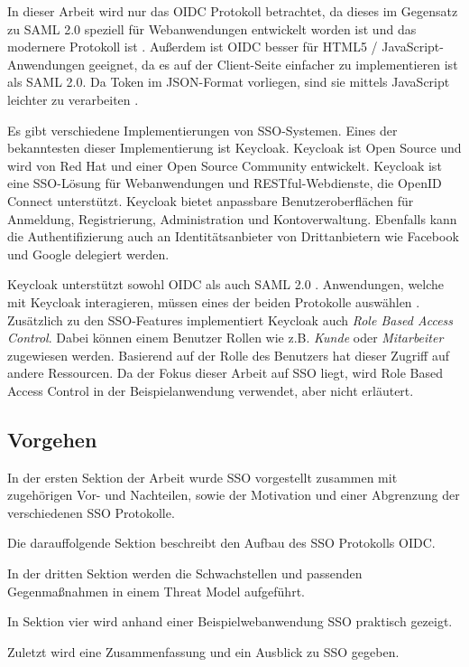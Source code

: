 In dieser Arbeit wird nur das OIDC Protokoll betrachtet, da dieses im Gegensatz zu SAML 2.0 speziell für Webanwendungen entwickelt worden ist und das modernere Protokoll ist \cite[OpenID Connect vs. SAML]{keycloakDocs}. Außerdem ist OIDC besser für HTML5 / JavaScript-Anwendungen geeignet, da es auf der Client-Seite einfacher zu implementieren ist als SAML 2.0. Da Token im JSON-Format vorliegen, sind sie mittels JavaScript leichter zu verarbeiten \cite{ssoProtocols}.

Es gibt verschiedene Implementierungen von SSO-Systemen. Eines der bekanntesten dieser Implementierung ist Keycloak. Keycloak ist Open Source und wird von Red Hat und einer Open Source Community entwickelt. Keycloak ist eine SSO-Lösung für Webanwendungen und RESTful-Webdienste, die OpenID Connect unterstützt. Keycloak bietet anpassbare Benutzeroberflächen für Anmeldung, Registrierung, Administration und Kontoverwaltung. Ebenfalls kann die Authentifizierung auch an Identitätsanbieter von Drittanbietern wie Facebook und Google delegiert werden. \cite{keycloakDocs}

Keycloak unterstützt sowohl OIDC als auch SAML 2.0 \cite{EB26}. Anwendungen, welche mit Keycloak interagieren, müssen eines der beiden Protokolle auswählen \cite{EB26}. Zusätzlich zu den SSO-Features implementiert Keycloak auch \textit{Role Based Access Control}. Dabei können einem Benutzer Rollen wie z.B. \textit{Kunde} oder \textit{Mitarbeiter} zugewiesen werden. Basierend auf der Rolle des Benutzers hat dieser Zugriff auf andere Ressourcen. Da der Fokus dieser Arbeit auf SSO liegt, wird Role Based Access Control in der Beispielanwendung verwendet, aber nicht erläutert.

\subsection{Vorgehen}

In der ersten Sektion der Arbeit wurde SSO vorgestellt zusammen mit zugehörigen Vor- und Nachteilen, sowie der Motivation und einer Abgrenzung der verschiedenen SSO Protokolle.

Die darauffolgende Sektion beschreibt den Aufbau des SSO Protokolls OIDC.

In der dritten Sektion werden die Schwachstellen und passenden Gegenmaßnahmen in einem Threat Model aufgeführt.

In Sektion vier wird anhand einer Beispielwebanwendung SSO praktisch gezeigt.

Zuletzt wird eine Zusammenfassung und ein Ausblick zu SSO gegeben.


